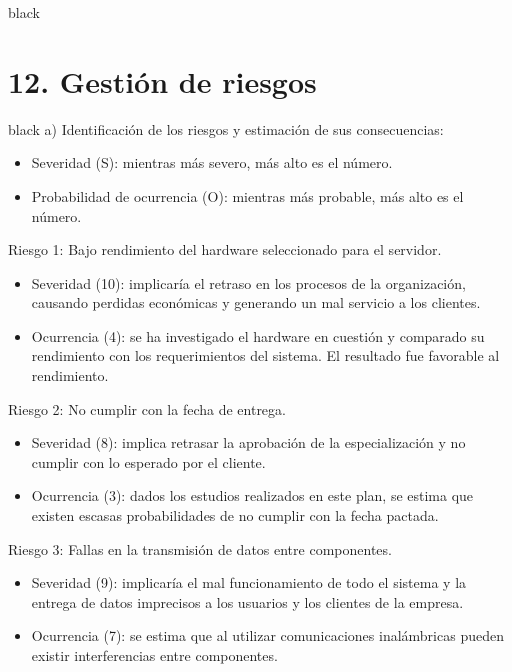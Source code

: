 \documentclass[11pt]{charter}
\begin{document}
\begin{consigna}{black}


\end{consigna}

\section{12. Gestión de riesgos}
\label{sec:riesgos}

\begin{consigna}{black}
a) Identificación de los riesgos y estimación de sus consecuencias:
 
\begin{itemize}
\item Severidad (S): mientras más severo, más alto es el número.\\
\item Probabilidad de ocurrencia (O): mientras más probable, más alto es el número.\\
\end{itemize}   

Riesgo 1: Bajo rendimiento del hardware seleccionado para el servidor.
\begin{itemize}
\item Severidad (10): implicaría el retraso en los procesos de la organización, causando perdidas económicas y generando un mal servicio a los clientes.
\item Ocurrencia (4): se ha investigado el hardware en cuestión y comparado su rendimiento con los requerimientos del sistema. El resultado fue favorable al rendimiento.
\end{itemize}

Riesgo 2: No cumplir con la fecha de entrega.
\begin{itemize}
\item Severidad (8): implica retrasar la aprobación de la especialización y no cumplir con lo esperado por el cliente.
\item Ocurrencia (3): dados los estudios realizados en este plan, se estima que existen escasas probabilidades de no cumplir con la fecha pactada. 
\end{itemize}

Riesgo 3: Fallas en la transmisión de datos entre componentes.
\begin{itemize}
\item Severidad (9): implicaría el mal funcionamiento de todo el sistema y la entrega de datos imprecisos a los usuarios y los clientes de la empresa.
\item Ocurrencia (7): se estima que al utilizar comunicaciones inalámbricas pueden existir interferencias entre componentes.
\end{itemize}


\end{consigna}
\end{document}
